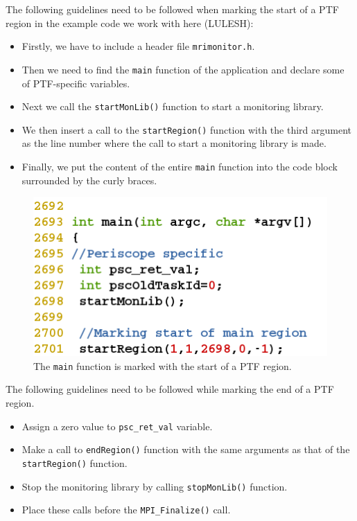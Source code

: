 The following guidelines need to be followed when marking the start of a PTF region in the example code we work with here (LULESH):
		
\begin{itemize}
	\item Firstly, we have to include a header file {\tt mrimonitor.h}.

	\item Then we need to find the {\tt main} function of the application and declare some of PTF-specific variables.

	\item Next we call the {\tt startMonLib()} function to start a monitoring library.

	\item We then insert a call to the {\tt startRegion()} function with the third argument as the line number where the call to start a monitoring library is made.

	\item Finally, we put the content of the entire {\tt main} function into the code block surrounded by the curly braces.
\end{itemize}
	
	\begin{figure} [H]
		\centering
		\includegraphics[scale=0.75]{../BPG/images/uc3_start_main_region.png}
		\caption{The {\tt main} function is marked with the start of a PTF region.}
		\label{fig:uc3_start_main_region}

	\end{figure}
	
		The following guidelines need to be followed while marking the end of a PTF region.
		\begin{itemize}
			\item Assign a zero value to {\tt psc\_ret\_val} variable.
			\item Make a call to {\tt endRegion()} function with the same arguments as that of the {\tt startRegion()} function.
			\item Stop the monitoring library by calling {\tt stopMonLib()} function.
			\item Place these calls before the {\tt MPI\_Finalize()} call.
		\end{itemize}

